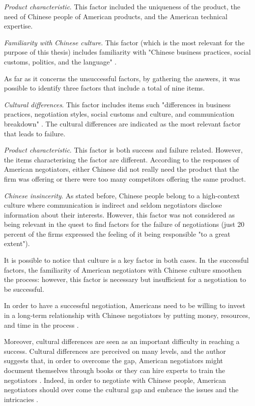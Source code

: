 \documentclass[../main.tex]{subfiles}
\begin{document}
\textit{Product characteristic}. This factor included the uniqueness of the product, the need of Chinese people of American products, and the American technical expertise.

\textit{Familiarity with Chinese culture}. This factor (which is the most relevant for the purpose of this thesis) includes familiarity with "Chinese business practices, social customs, politics, and the language" \autocite[67]{tung}.

As far as it concerns the unsuccessful factors, by gathering the answers, it was possible to identify three factors that include a total of nine items.

\textit{Cultural differences}. This factor includes items such "differences in business practices, negotiation styles, social customs and culture, and communication breakdown" \autocite[67]{tung}. The cultural differences are indicated as the most relevant factor that leads to failure.

\textit{Product characteristic}. This factor is both success and failure related. However, the items characterising the factor are different. According to the responses of American negotiators, either Chinese did not really need the product that the firm was offering or there were too many competitors offering the same product.

\textit{Chinese insincerity}. As stated before, Chinese people belong to a high-context culture where communication is indirect and seldom negotiators disclose information about their interests. However, this factor was not considered as being relevant in the quest to find factors for the failure of negotiations (just 20 percent of the firms expressed the feeling of it being responsible "to a great extent").

It is possible to notice that culture is a key factor in both cases. In the successful factors, the familiarity of American negotiators with Chinese culture smoothen the process: however, this factor is necessary but insufficient for a negotiation to be successful.

In order to have a successful negotiation, Americans need to be willing to invest in a long-term relationship with Chinese negotiators by putting money, resources, and time in the process \autocite[71]{tung}.

Moreover, cultural differences are seen as an important difficulty in reaching a success. Cultural differences are perceived on many levels, and the author suggests that, in order to overcome the gap, American negotiators might document themselves through books or they can hire experts to train the negotiators \autocite[68]{tung}. Indeed, in order to negotiate with Chinese people, American negotiators should over come the cultural gap and embrace the issues and the intricacies \mancite\autocite[72]{tung}.
\end{document}
